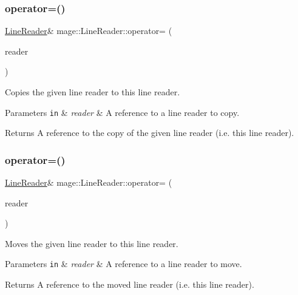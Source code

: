\subsubsection{\texorpdfstring{operator=()}{operator=()}\hspace{0.1cm}{\footnotesize\ttfamily [1/2]}}
{\footnotesize\ttfamily \hyperlink{classmage_1_1_line_reader}{Line\+Reader}\& mage\+::\+Line\+Reader\+::operator= (\begin{DoxyParamCaption}\item[{const \hyperlink{classmage_1_1_line_reader}{Line\+Reader} \&}]{reader }\end{DoxyParamCaption})\hspace{0.3cm}{\ttfamily [delete]}}

Copies the given line reader to this line reader.


\begin{DoxyParams}[1]{Parameters}
\mbox{\tt in}  & {\em reader} & A reference to a line reader to copy. \\
\hline
\end{DoxyParams}
\begin{DoxyReturn}{Returns}
A reference to the copy of the given line reader (i.\+e. this line reader). 
\end{DoxyReturn}
\hypertarget{classmage_1_1_line_reader_a45504c0ba4238eedf851cfb9df081a01}{}\label{classmage_1_1_line_reader_a45504c0ba4238eedf851cfb9df081a01} 
\subsubsection{\texorpdfstring{operator=()}{operator=()}\hspace{0.1cm}{\footnotesize\ttfamily [2/2]}}
{\footnotesize\ttfamily \hyperlink{classmage_1_1_line_reader}{Line\+Reader}\& mage\+::\+Line\+Reader\+::operator= (\begin{DoxyParamCaption}\item[{\hyperlink{classmage_1_1_line_reader}{Line\+Reader} \&\&}]{reader }\end{DoxyParamCaption})\hspace{0.3cm}{\ttfamily [delete]}}

Moves the given line reader to this line reader.


\begin{DoxyParams}[1]{Parameters}
\mbox{\tt in}  & {\em reader} & A reference to a line reader to move. \\
\hline
\end{DoxyParams}
\begin{DoxyReturn}{Returns}
A reference to the moved line reader (i.\+e. this line reader). 
\end{DoxyReturn}
\hypertarget{classmage_1_1_line_reader_adfde21013140a1058d3dd567204abfb5}{}\label{classmage_1_1_line_reader_adfde21013140a1058d3dd567204abfb5} 
